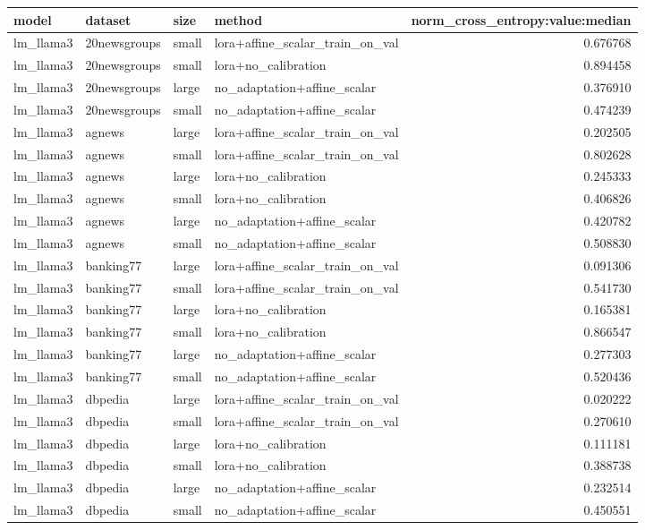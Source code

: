 \begin{tabular}{llllr}
\toprule
model & dataset & size & method & norm_cross_entropy:value:median \\
\midrule
lm_llama3 & 20newsgroups & small & lora+affine_scalar_train_on_val & 0.676768 \\
lm_llama3 & 20newsgroups & small & lora+no_calibration & 0.894458 \\
lm_llama3 & 20newsgroups & large & no_adaptation+affine_scalar & 0.376910 \\
lm_llama3 & 20newsgroups & small & no_adaptation+affine_scalar & 0.474239 \\
lm_llama3 & agnews & large & lora+affine_scalar_train_on_val & 0.202505 \\
lm_llama3 & agnews & small & lora+affine_scalar_train_on_val & 0.802628 \\
lm_llama3 & agnews & large & lora+no_calibration & 0.245333 \\
lm_llama3 & agnews & small & lora+no_calibration & 0.406826 \\
lm_llama3 & agnews & large & no_adaptation+affine_scalar & 0.420782 \\
lm_llama3 & agnews & small & no_adaptation+affine_scalar & 0.508830 \\
lm_llama3 & banking77 & large & lora+affine_scalar_train_on_val & 0.091306 \\
lm_llama3 & banking77 & small & lora+affine_scalar_train_on_val & 0.541730 \\
lm_llama3 & banking77 & large & lora+no_calibration & 0.165381 \\
lm_llama3 & banking77 & small & lora+no_calibration & 0.866547 \\
lm_llama3 & banking77 & large & no_adaptation+affine_scalar & 0.277303 \\
lm_llama3 & banking77 & small & no_adaptation+affine_scalar & 0.520436 \\
lm_llama3 & dbpedia & large & lora+affine_scalar_train_on_val & 0.020222 \\
lm_llama3 & dbpedia & small & lora+affine_scalar_train_on_val & 0.270610 \\
lm_llama3 & dbpedia & large & lora+no_calibration & 0.111181 \\
lm_llama3 & dbpedia & small & lora+no_calibration & 0.388738 \\
lm_llama3 & dbpedia & large & no_adaptation+affine_scalar & 0.232514 \\
lm_llama3 & dbpedia & small & no_adaptation+affine_scalar & 0.450551 \\

\end{tabular}

